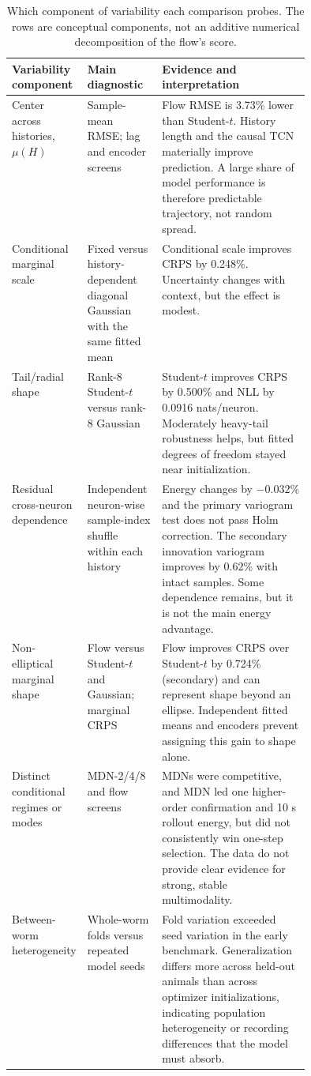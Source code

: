 \documentclass[11pt]{article}
\begin{document}
\begin{table}[ht]
\centering
\scriptsize
\caption{Which component of variability each comparison probes. The rows are conceptual components, not an additive numerical decomposition of the flow's score.}
\label{tab:variability}
\begin{tabularx}{\linewidth}{p{0.19\linewidth}p{0.25\linewidth}X}
\toprule
Variability component & Main diagnostic & Evidence and interpretation \\
\midrule
Center across histories, $\mu(H)$ & Sample-mean RMSE; lag and encoder screens & Flow RMSE is 3.73\% lower than Student-$t$. History length and the causal TCN materially improve prediction. A large share of model performance is therefore predictable trajectory, not random spread. \\
Conditional marginal scale & Fixed versus history-dependent diagonal Gaussian with the same fitted mean & Conditional scale improves CRPS by 0.248\%. Uncertainty changes with context, but the effect is modest. \\
Tail/radial shape & Rank-8 Student-$t$ versus rank-8 Gaussian & Student-$t$ improves CRPS by 0.500\% and NLL by 0.0916 nats/neuron. Moderately heavy-tail robustness helps, but fitted degrees of freedom stayed near initialization. \\
Residual cross-neuron dependence & Independent neuron-wise sample-index shuffle within each history & Energy changes by $-0.032\%$ and the primary variogram test does not pass Holm correction. The secondary innovation variogram improves by 0.62\% with intact samples. Some dependence remains, but it is not the main energy advantage. \\
Non-elliptical marginal shape & Flow versus Student-$t$ and Gaussian; marginal CRPS & Flow improves CRPS over Student-$t$ by 0.724\% (secondary) and can represent shape beyond an ellipse. Independent fitted means and encoders prevent assigning this gain to shape alone. \\
Distinct conditional regimes or modes & MDN-2/4/8 and flow screens & MDNs were competitive, and MDN led one higher-order confirmation and 10 s rollout energy, but did not consistently win one-step selection. The data do not provide clear evidence for strong, stable multimodality. \\
Between-worm heterogeneity & Whole-worm folds versus repeated model seeds & Fold variation exceeded seed variation in the early benchmark. Generalization differs more across held-out animals than across optimizer initializations, indicating population heterogeneity or recording differences that the model must absorb. \\
\bottomrule
\end{tabularx}
\end{table}
\end{document}
